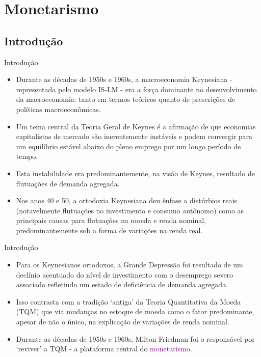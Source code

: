 \documentclass[10pt]{beamer}
\begin{document}
\section{Monetarismo}
\subsection{Introdução}
\begin{frame}{Introdução}
    \begin{itemize}
        \item Durante as décadas de 1950s e 1960s, a macroeconomia Keynesiana - representada pelo modelo IS-LM - era a força dominante no desenvolvimento da macroeconomia: tanto em termos teóricos quanto de prescrições de políticas macroeconômicas.
        \bigskip
        \item Um tema central da Teoria Geral de Keynes é a afirmação de que economias capitalistas de mercado são inerentemente instáveis e podem convergir para um equilíbrio estável abaixo do pleno emprego por um longo período de tempo.
        \bigskip
        \item Esta instabilidade era predominantemente, na visão de Keynes, resultado de flutuações de demanda agregada.
        \bigskip
        \item Nos anos 40 e 50, a ortodoxia Keynesiana deu ênfase a distúrbios reais (notavelmente flutuações no investimento e consumo autônomo) como as principais causas para flutuações na moeda e renda nominal, predominantemente sob a forma de variações na renda real.
    \end{itemize}
\end{frame}

\begin{frame}{Introdução}
    \begin{itemize}
        \item Para os Keynesianos ortodoxos, a Grande Depressão foi resultado de um declínio acentuado do nível de investimento com o desemprego severo associado refletindo um estado de deficiência de demanda agregada.
        \bigskip
        \item Isso contrasta com a tradição `antiga' da Teoria Quantitativa da Moeda (TQM) que via mudanças no estoque de moeda como o fator predominante, apesar de não o único, na explicação de variações de renda nominal.
        \bigskip
        \item Durante as décadas de 1950s e 1960s, Milton Friedman foi o responsável por `reviver' a TQM - a plataforma central do \textcolor{purple}{monetarismo}.
    \end{itemize}
\end{frame}
\end{document}
